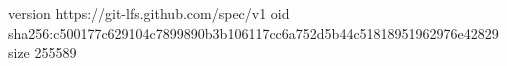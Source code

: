version https://git-lfs.github.com/spec/v1
oid sha256:c500177c629104c7899890b3b106117cc6a752d5b44c51818951962976e42829
size 255589

